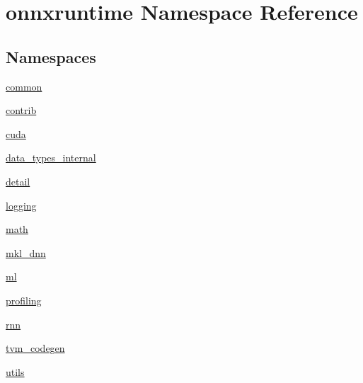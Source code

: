 \hypertarget{namespaceonnxruntime}{}\section{onnxruntime Namespace Reference}
\label{namespaceonnxruntime}
\subsection*{Namespaces}
\begin{DoxyCompactItemize}
\item 
 \mbox{\hyperlink{namespaceonnxruntime_1_1common}{common}}
\item 
 \mbox{\hyperlink{namespaceonnxruntime_1_1contrib}{contrib}}
\item 
 \mbox{\hyperlink{namespaceonnxruntime_1_1cuda}{cuda}}
\item 
 \mbox{\hyperlink{namespaceonnxruntime_1_1data__types__internal}{data\+\_\+types\+\_\+internal}}
\item 
 \mbox{\hyperlink{namespaceonnxruntime_1_1detail}{detail}}
\item 
 \mbox{\hyperlink{namespaceonnxruntime_1_1logging}{logging}}
\item 
 \mbox{\hyperlink{namespaceonnxruntime_1_1math}{math}}
\item 
 \mbox{\hyperlink{namespaceonnxruntime_1_1mkl__dnn}{mkl\+\_\+dnn}}
\item 
 \mbox{\hyperlink{namespaceonnxruntime_1_1ml}{ml}}
\item 
 \mbox{\hyperlink{namespaceonnxruntime_1_1profiling}{profiling}}
\item 
 \mbox{\hyperlink{namespaceonnxruntime_1_1rnn}{rnn}}
\item 
 \mbox{\hyperlink{namespaceonnxruntime_1_1tvm__codegen}{tvm\+\_\+codegen}}
\item 
 \mbox{\hyperlink{namespaceonnxruntime_1_1utils}{utils}}
\end{DoxyCompactItemize}
